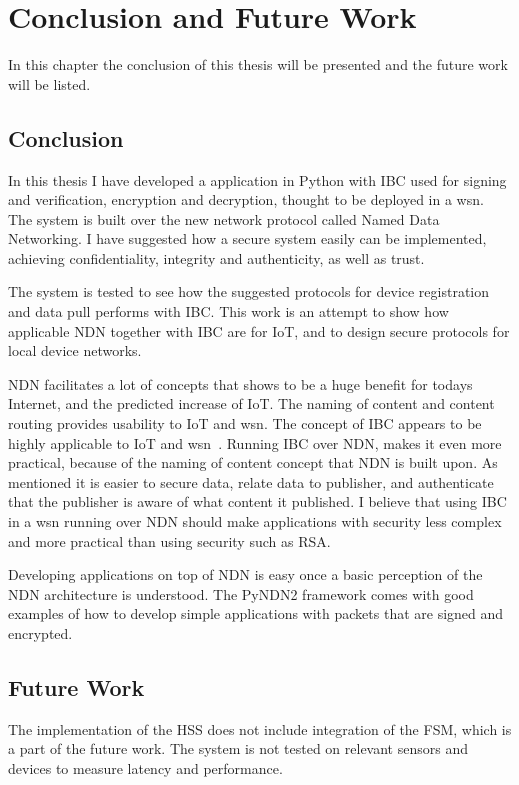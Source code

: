 \chapter{Conclusion and Future Work}\label{chp7:conclusion}
In this chapter the conclusion of this thesis will be presented and the future work will be listed.

\section{Conclusion}
In this thesis I have developed a application in Python with \gls{IBC} used for signing and verification, encryption and decryption, thought to be deployed in a \gls{wsn}.
The system is built over the new network protocol called Named Data Networking.
I have suggested how a secure system easily can be implemented, achieving confidentiality, integrity and authenticity, as well as trust.

The system is tested to see how the suggested protocols for device registration and data pull performs with \gls{IBC}. 
This work is an attempt to show how applicable \gls{NDN} together with \gls{IBC} are for \gls{IoT}, and to design secure protocols for local device networks.

\gls{NDN} facilitates a lot of concepts that shows to be a huge benefit for todays Internet, and the predicted increase of \gls{IoT}.
The naming of content and content routing provides usability to \gls{IoT} and \gls{wsn}.
The concept of \gls{IBC} appears to be highly applicable to \gls{IoT} and \gls{wsn}~\cite{Patil:2012:SWS:2464778}.
Running \gls{IBC} over \gls{NDN}, makes it even more practical, because of the naming of content concept that \gls{NDN} is built upon. 
As mentioned it is easier to secure data, relate data to publisher, and authenticate that the publisher is aware of what content it published. 
I believe that using \gls{IBC} in a \gls{wsn} running over \gls{NDN} should make applications with security less complex and more practical than using security such as RSA. 

Developing applications on top of \gls{NDN} is easy once a basic perception of the \gls{NDN} architecture is understood.
The \gls{PyNDN2} framework comes with good examples of how to develop simple applications with packets that are signed and encrypted.

\section{Future Work}
The implementation of the \gls{HSS} does not include integration of the \gls{FSM}, which is a part of the future work.
The system is not tested on relevant sensors and devices to measure latency and performance.

